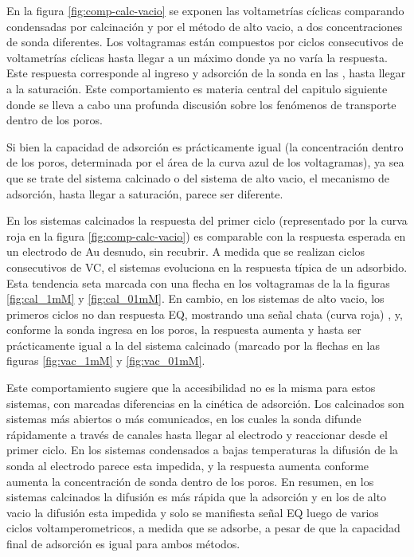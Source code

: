 	  En la figura \ref{fig:comp-calc-vacio} se exponen las voltametrías cíclicas comparando \pdmF\space condensadas por calcinación y por el método de alto vacio, a dos concentraciones de sonda diferentes. Los voltagramas están compuestos por ciclos consecutivos de voltametrías cíclicas hasta llegar a un máximo donde ya no varía la respuesta. Este respuesta corresponde al ingreso y adsorción de la sonda en las \pdm, hasta llegar a la saturación. Este comportamiento es materia central del capitulo siguiente donde se lleva a cabo una profunda discusión sobre los fenómenos de transporte dentro de los poros.

      Si bien la capacidad de adsorción es prácticamente igual (la concentración dentro de los poros, determinada por el área de la curva azul de los voltagramas), ya sea que se trate del sistema calcinado o del sistema de alto vacio, el mecanismo de adsorción, hasta llegar a saturación, parece ser diferente. 

      En los sistemas calcinados la respuesta del primer ciclo (representado por la curva roja en la figura \ref{fig:comp-calc-vacio}) es comparable con la respuesta esperada en un electrodo de Au desnudo, sin recubrir. A medida que se realizan ciclos consecutivos de VC, el sistemas evoluciona en la respuesta típica de un adsorbido. Esta tendencia seta marcada con una flecha en los voltagramas de la la figuras \ref{fig:cal_1mM} y \ref{fig:cal_01mM}. En cambio, en los sistemas de alto vacio, los primeros ciclos no dan respuesta EQ, mostrando una señal chata (curva roja) , y, conforme la sonda ingresa en los poros, la respuesta aumenta y hasta ser prácticamente igual a la del sistema calcinado (marcado por la flechas en las figuras \ref{fig:vac_1mM} y \ref{fig:vac_01mM}. 

      Este comportamiento sugiere que la accesibilidad no es la misma para estos sistemas, con marcadas diferencias en la cinética de adsorción. Los calcinados son sistemas más abiertos o más comunicados, en los cuales la sonda difunde rápidamente a través de canales hasta llegar al electrodo y reaccionar desde el primer ciclo. En los sistemas condensados a bajas temperaturas la difusión de la sonda al electrodo parece esta impedida, y la respuesta aumenta conforme aumenta la concentración de sonda dentro de los poros. En resumen, en los sistemas calcinados la difusión es más rápida que la adsorción y en los de alto vacio la difusión esta impedida y solo se manifiesta señal EQ luego de varios ciclos voltamperometricos, a medida que se adsorbe, a pesar de que la capacidad final de adsorción es igual para ambos métodos.

